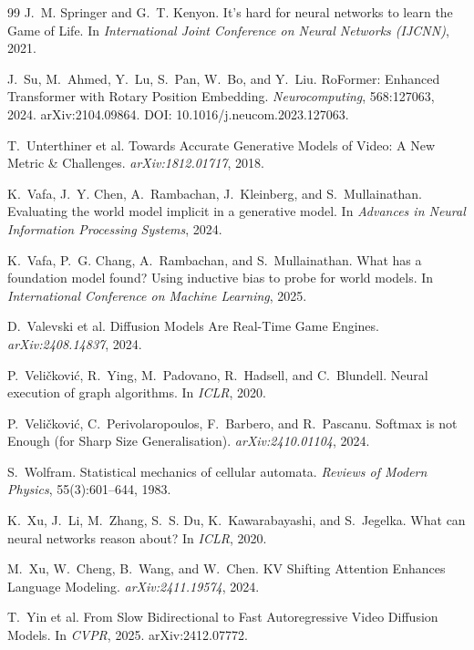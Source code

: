 \documentclass[11pt]{article}
\begin{document}
\begin{thebibliography}{99}
J.~M. Springer and G.~T. Kenyon.
It's hard for neural networks to learn the Game of Life.
In \emph{International Joint Conference on Neural Networks (IJCNN)}, 2021.

J.~Su, M.~Ahmed, Y.~Lu, S.~Pan, W.~Bo, and Y.~Liu.
RoFormer: Enhanced Transformer with Rotary Position Embedding.
\emph{Neurocomputing}, 568:127063, 2024. arXiv:2104.09864.
DOI: 10.1016/j.neucom.2023.127063.

T.~Unterthiner et al.
Towards Accurate Generative Models of Video: A New Metric \& Challenges. \emph{arXiv:1812.01717}, 2018.

K.~Vafa, J.~Y. Chen, A.~Rambachan, J.~Kleinberg, and S.~Mullainathan.
Evaluating the world model implicit in a generative model.
In \emph{Advances in Neural Information Processing Systems}, 2024.

K.~Vafa, P.~G. Chang, A.~Rambachan, and S.~Mullainathan.
What has a foundation model found? {U}sing inductive bias to probe for world models.
In \emph{International Conference on Machine Learning}, 2025.

D.~Valevski et al.
Diffusion Models Are Real-Time Game Engines. \emph{arXiv:2408.14837}, 2024.

P.~Veli\v{c}kovi\'c, R.~Ying, M.~Padovano, R.~Hadsell, and C.~Blundell.
Neural execution of graph algorithms. In \emph{ICLR}, 2020.

P.~Veli\v{c}kovi\'c, C.~Perivolaropoulos, F.~Barbero, and R.~Pascanu.
Softmax is not Enough (for Sharp Size Generalisation). \emph{arXiv:2410.01104}, 2024.

S.~Wolfram.
Statistical mechanics of cellular automata.
\emph{Reviews of Modern Physics}, 55(3):601--644, 1983.

K.~Xu, J.~Li, M.~Zhang, S.~S. Du, K.~Kawarabayashi, and S.~Jegelka.
What can neural networks reason about? In \emph{ICLR}, 2020.

M.~Xu, W.~Cheng, B.~Wang, and W.~Chen.
KV Shifting Attention Enhances Language Modeling. \emph{arXiv:2411.19574}, 2024.

T.~Yin et al.
From Slow Bidirectional to Fast Autoregressive Video Diffusion Models. In \emph{CVPR}, 2025. arXiv:2412.07772.

\end{thebibliography}
\end{document}
